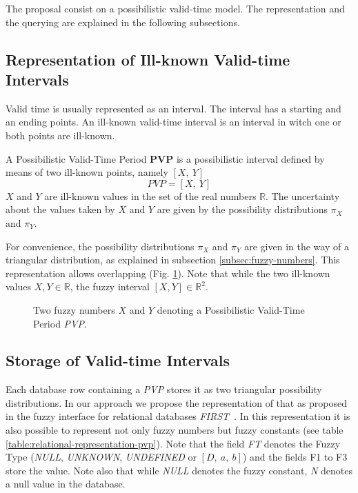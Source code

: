 The proposal consist on a possibilistic valid-time model. The representation and the querying are explained in the following subsections.

\subsection{Representation of Ill-known Valid-time Intervals}
\label{subsec:representation-ill-known}
Valid time is usually represented as an interval. The interval has a starting and an ending points. An ill-known valid-time interval is an interval in witch one or both points are ill-known. 

\begin{definition}
A Possibilistic Valid-Time Period \textbf{PVP} is a possibilistic interval defined by means of two ill-known points, namely $\left[ X,\ Y \right]$
\begin{equation}
PVP = \left[X,\ Y \right] 
\end{equation}
$X$ and $Y$ are ill-known values in the set of the real numbers $\mathbb{R}$. The uncertainty about the values taken by $X$ and $Y$ are given by the possibility distributions $\pi_X$ and $\pi_Y$.
\end{definition}

For convenience, the possibility distributions $\pi_X$ and $\pi_Y$ are given in the way of a triangular distribution, as explained in subsection \ref{subsec:fuzzy-numbers}. This representation allows overlapping (Fig. \ref{fig:pvp}). Note that while the two ill-known values $X,Y \in \mathbb{R}$, the fuzzy interval  $[X,Y] \in \mathbb{R}^2$.


\begin{figure}[h!]
  \centering
  
  \caption{Two fuzzy numbers $X$ and $Y$ denoting a Possibilistic Valid-Time Period \emph{PVP}.}
  \label{fig:pvp}
\end{figure}

\subsection{Storage of Valid-time Intervals}
\label{subsec:storage}
Each database row containing a \emph{PVP} stores it as two triangular possibility distributions. In our approach we propose the representation of that as proposed in the  fuzzy interface for relational databases \emph{FIRST}~\cite{Medina94gefred.a,Gal98}. In this representation it is also possible to represent not only fuzzy numbers but fuzzy constants (see table \ref{table:relational-representation-pvp}). Note that the field \emph{FT} denotes the Fuzzy Type (\emph{NULL}, \emph{UNKNOWN}, \emph{UNDEFINED} or $\left[D,\ a,\ b \right]$) and the fields F1 to F3 store the value. Note also that while \emph{NULL} denotes the fuzzy constant, \emph{N} denotes a null value in the database.

